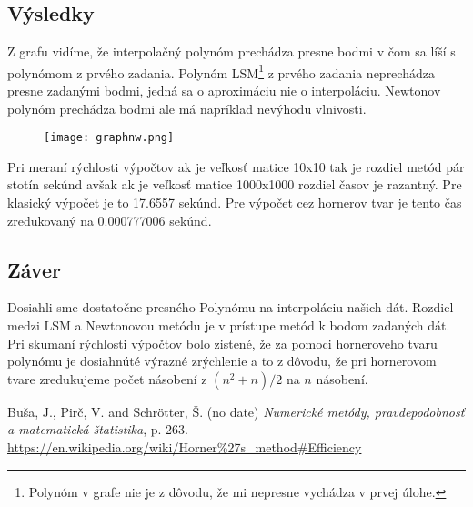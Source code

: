 \documentclass{article}
\theoremstyle{definition}
\theoremstyle{remark}
\begin{document}
\subsection{Výsledky}\label{sec:nothing}
Z grafu vidíme, že interpolačný polynóm prechádza presne bodmi v čom sa líší s polynómom z prvého zadania. Polynóm LSM\footnote{Polynóm v grafe nie je z dôvodu, že mi nepresne vychádza v prvej úlohe.} z prvého zadania neprechádza presne zadanými bodmi, jedná sa o aproximáciu nie o interpoláciu. Newtonov polynóm prechádza bodmi ale má napríklad nevýhodu vlnivosti. 
\begin{figure}[!htb]
\texttt{[image: graphnw.png]}
\centering
\end{figure}
Pri meraní rýchlosti výpočtov ak je veľkosť matice 10x10 tak je rozdiel metód pár stotín sekúnd avšak ak je veľkosť matice 1000x1000 rozdiel časov je razantný. Pre klasický výpočet je to 17.6557 sekúnd. Pre výpočet cez hornerov tvar je tento čas zredukovaný na 0.000777006 sekúnd.

\subsection{Záver}\label{sec:nothing}
Dosiahli sme dostatočne presného Polynómu na interpoláciu našich dát. Rozdiel medzi LSM a Newtonovou metódu je v prístupe metód k bodom zadaných dát. Pri skumaní rýchlosti výpočtov bolo zistené, že za pomoci horneroveho tvaru polynómu je dosiahnúté výrazné zrýchlenie a to z dôvodu, že pri hornerovom tvare zredukujeme počet násobení z $(n^2 + n)/2$ na $n$ násobení\cite{wiki}.  
\begin{thebibliography}{99}
 Buša, J., Pirč, V. and Schrötter, Š. (no date) \emph{Numerické metódy, pravdepodobnosť a matematická štatistika}, p. 263.
 \url{https://en.wikipedia.org/wiki/Horner%27s_method#Efficiency}

\end{thebibliography}
\end{document}
